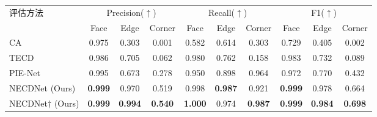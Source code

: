 \begin{table}[ht]
    \small
    \centering
    \label{tab:metrics_result_part1}
    \begin{threeparttable}
        \setlength{\tabcolsep}{5.5pt}
        \begin{tabular}{l ccc ccc ccc}
        \toprule
        评估方法 & \multicolumn{3}{c}{Precision($\uparrow$)} & \multicolumn{3}{c}{Recall($\uparrow$)} & \multicolumn{3}{c}{F1($\uparrow$)} \\
        \cmidrule(lr){2-4} \cmidrule(lr){5-7} \cmidrule(lr){8-10} 
         & Face & Edge & Corner & Face & Edge & Corner & Face & Edge & Corner \\
        \midrule
        CA~\cite{bazazian_fast_2015} & 0.975 & 0.303 & 0.001 & 0.582 & 0.614 & 0.303 & 0.729 & 0.405 & 0.002 \\
        TECD~\cite{ahmed_edge_2018} & 0.986 & 0.705 & 0.062 & 0.980 & 0.762 & 0.158 & 0.983 & 0.732 & 0.089 \\
        PIE-Net~\cite{wang_pienet_2020} & 0.995 & 0.673 & 0.278 & 0.950 & 0.898 & 0.964 & 0.972 & 0.770 & 0.432 \\
        NECDNet (Ours) & \textbf{0.999}& 0.970 & 0.519 & 0.998 & \textbf{0.987}& 0.921 & \textbf{0.999}& 0.978 & 0.664 \\
        NECDNet$\dagger$ (Ours) & \textbf{0.999}& \textbf{0.994}& \textbf{0.540}& \textbf{1.000}& 0.974 & \textbf{0.987}& \textbf{0.999}& \textbf{0.984}& \textbf{0.698} \\
        \end{tabular}
        


\end{threeparttable}
\end{table}
